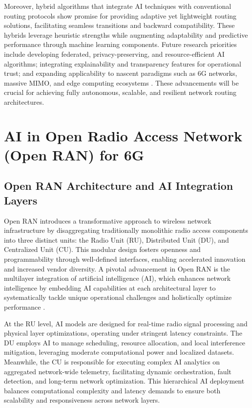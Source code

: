 \documentclass[sigconf]{acmart}
\begin{document}
Moreover, hybrid algorithms that integrate AI techniques with conventional routing protocols show promise for providing adaptive yet lightweight routing solutions, facilitating seamless transitions and backward compatibility. These hybrids leverage heuristic strengths while augmenting adaptability and predictive performance through machine learning components. Future research priorities include developing federated, privacy-preserving, and resource-efficient AI algorithms; integrating explainability and transparency features for operational trust; and expanding applicability to nascent paradigms such as 6G networks, massive MIMO, and edge computing ecosystems \cite{ref53}. These advancements will be crucial for achieving fully autonomous, scalable, and resilient network routing architectures.

\section{AI in Open Radio Access Network (Open RAN) for 6G}

\subsection{Open RAN Architecture and AI Integration Layers}

Open RAN introduces a transformative approach to wireless network infrastructure by disaggregating traditionally monolithic radio access components into three distinct units: the Radio Unit (RU), Distributed Unit (DU), and Centralized Unit (CU). This modular design fosters openness and programmability through well-defined interfaces, enabling accelerated innovation and increased vendor diversity. A pivotal advancement in Open RAN is the multilayer integration of artificial intelligence (AI), which enhances network intelligence by embedding AI capabilities at each architectural layer to systematically tackle unique operational challenges and holistically optimize performance \cite{ref54}.

At the RU level, AI models are designed for real-time radio signal processing and physical layer optimizations, operating under stringent latency constraints. The DU employs AI to manage scheduling, resource allocation, and local interference mitigation, leveraging moderate computational power and localized datasets. Meanwhile, the CU is responsible for executing complex AI analytics on aggregated network-wide telemetry, facilitating dynamic orchestration, fault detection, and long-term network optimization. This hierarchical AI deployment balances computational complexity and latency demands to ensure both scalability and responsiveness across network layers.
\end{document}
